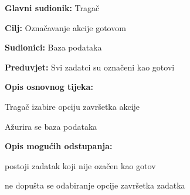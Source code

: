 					\noindent {}
					\begin{packed_item}
	
						\item \textbf{Glavni sudionik: } Tragač
						\item  \textbf{Cilj:} Označavanje akcije gotovom
						\item  \textbf{Sudionici:} Baza podataka
						\item  \textbf{Preduvjet:} Svi zadatci su označeni kao gotovi
						\item  \textbf{Opis osnovnog tijeka:}
						
						\item[] \begin{packed_enum}
	
							\item Tragač izabire opciju završetka akcije
							\item Ažurira se baza podataka
						
						\end{packed_enum}
						
						\item  \textbf{Opis mogućih odstupanja:}
						
						\item[] \begin{packed_item}
	
							\item[2.a] postoji zadatak koji nije ozačen kao gotov
							\item[] \begin{packed_enum}
								
								\item ne dopušta se odabiranje opcije završetka zadatka
								
							\end{packed_enum}

						\end{packed_item}
					\end{packed_item}
